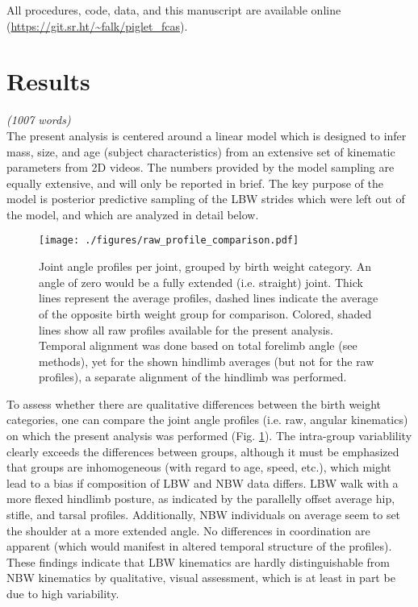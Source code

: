 \documentclass[10pt,a4paper]{article}
\begin{document}
All procedures, code, data, and this manuscript are available online (\url{https://git.sr.ht/\~falk/piglet\_fcas}).

\FloatBarrier
\clearpage
\section{Results}
\label{results}
\emph{(1007 words)\\\empty
}
The present analysis is centered around a linear model which is designed to infer mass, size, and age (subject characteristics) from an extensive set of kinematic parameters from 2D videos.
The numbers provided by the model sampling are equally extensive, and will only be reported in brief.
The key purpose of the model is posterior predictive sampling of the LBW strides which were left out of the model, and which are analyzed in detail below.


\bigskip

\begin{figure}[b!]
\centering
\texttt{[image: ./figures/raw\_profile\_comparison.pdf]}
\caption{\label{fig:raw_data}Joint angle profiles per joint, grouped by birth weight category. An angle of zero would be a fully extended (i.e. straight) joint. Thick lines represent the average profiles, dashed lines indicate the average of the opposite birth weight group for comparison. Colored, shaded lines show all raw profiles available for the present analysis. Temporal alignment was done based on total forelimb angle (see methods), yet for the shown hindlimb averages (but not for the raw profiles), a separate alignment of the hindlimb was performed.}
\end{figure}

To assess whether there are qualitative differences between the birth weight categories, one can compare the joint angle profiles (i.e. raw, angular kinematics) on which the present analysis was performed (Fig. \ref{fig:raw_data}).
The intra-group variablility clearly exceeds the differences between groups, although it must be emphasized that groups are inhomogeneous (with regard to age, speed, etc.), which might lead to a bias if composition of LBW and NBW data differs.
LBW walk with a more flexed hindlimb posture, as indicated by the parallelly offset average hip, stifle, and tarsal profiles.
Additionally, NBW individuals on average seem to set the shoulder at a more extended angle.
No differences in coordination are apparent (which would manifest in altered temporal structure of the profiles).
These findings indicate that LBW kinematics are hardly distinguishable from NBW kinematics by qualitative, visual assessment, which is at least in part be due to high variability.
\end{document}
